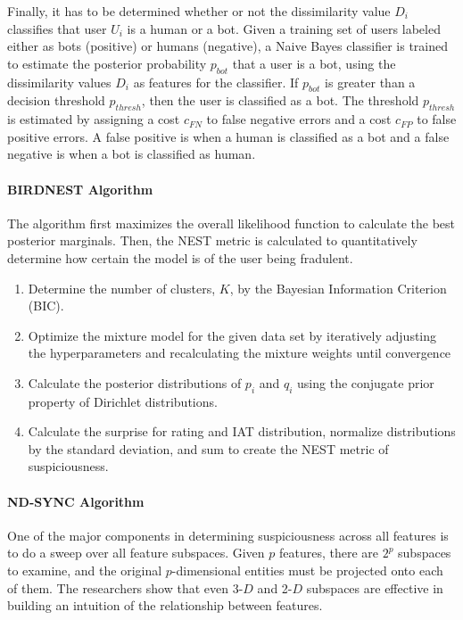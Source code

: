 \documentclass[11pt, oneside]{article}   	%
\begin{document}
\quad Finally, it has to be determined whether or not the dissimilarity value $D_i$ classifies that user $U_i$ is a human or a bot.
Given a training set of users labeled either as bots (positive) or humans (negative), a Naive Bayes classifier is trained to estimate the posterior probability $p_{bot}$ that a user is a bot, using the dissimilarity values $D_i$ as features for the classifier.
If $p_{bot}$ is greater than a decision threshold $p_{thresh}$, then the user is classified as a bot.
The threshold $p_{thresh}$ is estimated by assigning a cost $c_{FN}$ to false negative errors and a cost $c_{FP}$ to false positive errors.
A false positive is when a human is classified as a bot and a false negative is when a bot is classified as human.

\paragraph*{BIRDNEST Algorithm}
\quad

\quad The algorithm \cite{birdnest} first maximizes the overall likelihood function to calculate the best posterior marginals.
Then, the NEST metric is calculated to quantitatively determine how certain the model is of the user being fradulent.
\begin{enumerate}
	\item Determine the number of clusters, $K$, by the Bayesian Information Criterion (BIC).
	\item Optimize the mixture model for the given data set by iteratively adjusting the hyperparameters and recalculating the mixture weights until convergence
	\item Calculate the posterior distributions of $p_i$ and $q_i$ using the conjugate prior property of Dirichlet distributions.
	\item Calculate the surprise for rating and IAT distribution, normalize distributions by the standard deviation, and sum to create the NEST metric of suspiciousness. 
\end{enumerate}

\paragraph*{ND-SYNC Algorithm}
\quad

\quad One of the major components in determining suspiciousness across all features is to do a sweep over all feature subspaces.
Given $p$ features, there are $2^p$ subspaces to examine, and the original $p$-dimensional entities must be projected onto each of them.
The researchers show that even 3-$D$ and 2-$D$ subspaces are effective in building an intuition of the relationship between features.
\end{document}
